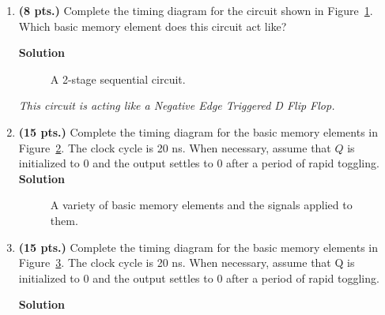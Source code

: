 \begin{enumerate}
    \item \textbf{ (8 pts.)} Complete the timing diagram for the circuit
        shown in Figure~\ref{fig:sequentialCirDMS}.  Which basic memory element
        does this circuit act like?

        \ifshowanswers \textbf{Solution} \fi

        \begin{figure}[ht]
            \label{fig:sequentialCirnand}
            \caption{A 2-stage sequential circuit.}
            \label{fig:sequentialCirDMS}
        \end{figure}
        \ifshowanswers \textit{\color{blue} This circuit is acting like a Negative Edge Triggered D Flip Flop.}\fi
        \filbreak %
    \item \textbf{ (15 pts.)} Complete the timing diagram for the basic memory
        elements in Figure~\ref{fig:sequentialCirExTim}.  The clock cycle is 20 ns. When
        necessary, assume that $Q$ is initialized to 0 and the output settles to
        0 after a period of rapid toggling. \needspace{4.78in} %
        \ifshowanswers \textbf{Solution} \fi
        \begin{figure}[ht]
            \caption{A variety of basic memory elements and the signals applied to them.}
            \label{fig:sequentialCirExTim}
        \end{figure}
    \item \textbf{ (15 pts.)} Complete the timing diagram for the basic memory elements in
        Figure~\ref{fig:sequentialCirExTim2}.  The clock cycle is 20 ns. When necessary,
        assume that Q is initialized to 0 and the output settles to 0 after
        a period of rapid toggling.\par
        \ifshowanswers \textbf{Solution} \fi
        \begin{figure}[ht]
            \caption{}
            \label{fig:sequentialCirExTim2}

\end{figure}
\end{enumerate}

